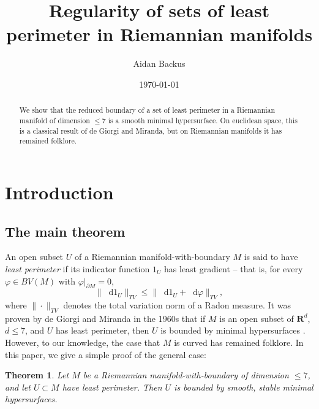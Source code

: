 \documentclass[reqno,11pt]{amsart}
\title{Regularity of sets of least perimeter in Riemannian manifolds}
\author{Aidan Backus}
\date{\today}
\newcommand{\RR}{\mathbf{R}}
\newcommand*\dif{\mathop{}\!\mathrm{d}}
\newcommand{\dfn}[1]{\emph{#1}\index{#1}}
\newtheorem{theorem}{Theorem}[section]
\theoremstyle{definition}
\numberwithin{equation}{section}
\begin{document}
\begin{abstract}
    We show that the reduced boundary of a set of least perimeter in a Riemannian manifold of dimension $\leq 7$ is a smooth minimal hypersurface.
    On euclidean space, this is a classical result of de Giorgi and Miranda, but on Riemannian manifolds it has remained folklore.
\end{abstract}

\maketitle

\section{Introduction}
\subsection{The main theorem}
An open subset $U$ of a Riemannian manifold-with-boundary $M$ is said to have \dfn{least perimeter} if its indicator function $1_U$ has least gradient -- that is, for every $\varphi \in BV(M)$ with $\varphi|_{\partial M} = 0$, 
\begin{equation}\label{least perimeter dfn}
\|\dif 1_U\|_{TV} \leq \|\dif 1_U + \dif \varphi\|_{TV},
\end{equation}
where $\|\cdot\|_{TV}$ denotes the total variation norm of a Radon measure.
It was proven by de Giorgi and Miranda in the 1960s that if $M$ is an open subset of $\RR^d$, $d \leq 7$, and $U$ has least perimeter, then $U$ is bounded by minimal hypersurfaces \cite{deGiorgi61, Miranda66}.
However, to our knowledge, the case that $M$ is curved has remained folklore.
In this paper, we give a simple proof of the general case:

\begin{theorem}\label{main thm}
Let $M$ be a Riemannian manifold-with-boundary of dimension $\leq 7$, and let $U \subset M$ have least perimeter.
Then $U$ is bounded by smooth, stable minimal hypersurfaces.
\end{theorem}
\end{document}
